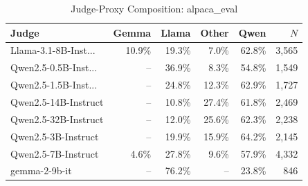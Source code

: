 \begin{table}[htbp]
\centering
\caption{Judge-Proxy Composition: alpaca_eval}
\label{tab:composition_alpaca_eval}
\begin{tabular}{lrrrrr}
\toprule
Judge & Gemma & Llama & Other & Qwen & $N$ \\
\midrule
Llama-3.1-8B-Inst... & 10.9\% & 19.3\% & 7.0\% & 62.8\% & 3,565 \\
Qwen2.5-0.5B-Inst... & -- & 36.9\% & 8.3\% & 54.8\% & 1,549 \\
Qwen2.5-1.5B-Inst... & -- & 24.8\% & 12.3\% & 62.9\% & 1,727 \\
Qwen2.5-14B-Instruct & -- & 10.8\% & 27.4\% & 61.8\% & 2,469 \\
Qwen2.5-32B-Instruct & -- & 12.0\% & 25.6\% & 62.3\% & 2,238 \\
Qwen2.5-3B-Instruct & -- & 19.9\% & 15.9\% & 64.2\% & 2,145 \\
Qwen2.5-7B-Instruct & 4.6\% & 27.8\% & 9.6\% & 57.9\% & 4,332 \\
gemma-2-9b-it & -- & 76.2\% & -- & 23.8\% & 846 \\
\bottomrule
\end{tabular}
\end{table}